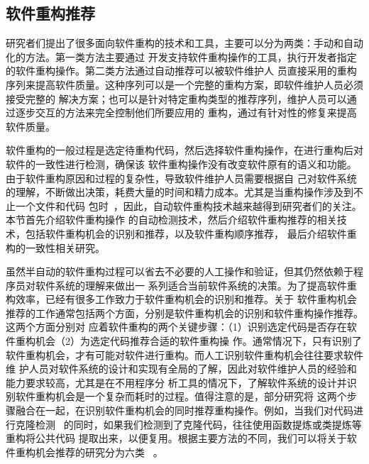 \subsection{软件重构推荐}

研究者们提出了很多面向软件重构的技术和工具，主要可以分为两类：手动和自动化的方法。第一类方法主要通过
开发支持软件重构操作的工具，执行开发者指定的软件重构操作。第二类方法通过自动推荐可以被软件维护人
员直接采用的重构序列来提高软件质量\cite{harman2007pareto, kessentini2011design,
ouni2013maintainability, Silva2014}。这种序列可以是一个完整的重构方案，即软件维护人员必须接受完整的
解决方案；也可以是针对特定重构类型的推荐序列，维护人员可以通过逐步交互的方法来完全控制他们所要应用的
重构，通过有针对性的修复来提高软件质量。

软件重构的一般过程是选定待重构代码，然后选择软件重构操作，在进行重构后对软件的一致性进行检测，确保该
软件重构操作没有改变软件原有的语义和功能。由于软件重构原因和过程的复杂性，导致软件维护人员需要根据自
己对软件系统的理解，不断做出决策，耗费大量的时间和精力成本。尤其是当重构操作涉及到不止一个文件和代码
包时~\cite{liu2013monitor}，因此，自动软件重构技术越来越得到研究者们的关注。本节首先介绍软件重构操作
的自动检测技术，然后介绍软件重构推荐的相关技术，包括软件重构机会的识别和推荐，以及软件重构顺序推荐，
最后介绍软件重构的一致性相关研究。


虽然半自动的软件重构过程可以省去不必要的人工操作和验证，但其仍然依赖于程序员对软件系统的理解来做出一
系列适合当前软件系统的决策。为了提高软件重构效率，已经有很多工作致力于软件重构机会的识别和推荐。关于
软件重构机会推荐的工作通常包括两个方面，分别是软件重构机会的识别和软件重构操作推荐。这两个方面分别对
应着软件重构的两个关键步骤：（1）识别选定代码是否存在软件重构机会（2）为选定代码推荐合适的软件重构操
作。通常情况下，只有识别了软件重构机会，才有可能对软件进行重构。而人工识别软件重构机会往往要求软件维
护人员对软件系统的设计和实现有全局的了解，因此对软件维护人员的经验和能力要求较高，尤其是在不用程序分
析工具的情况下，了解软件系统的设计并识别软件重构机会是一个复杂而耗时的过程。值得注意的是，部分研究将
这两个步骤融合在一起，在识别软件重构机会的同时推荐重构操作。例如，当我们对代码进行克隆检测
~\cite{kamiya2002ccfinder}的同时，如果我们检测到了克隆代码，往往使用函数提炼或类提炼等重构将公共代码
提取出来，以便复用。根据主要方法的不同，我们可以将关于软件重构机会推荐的研究分为六类
~\cite{al2015identifying}。

